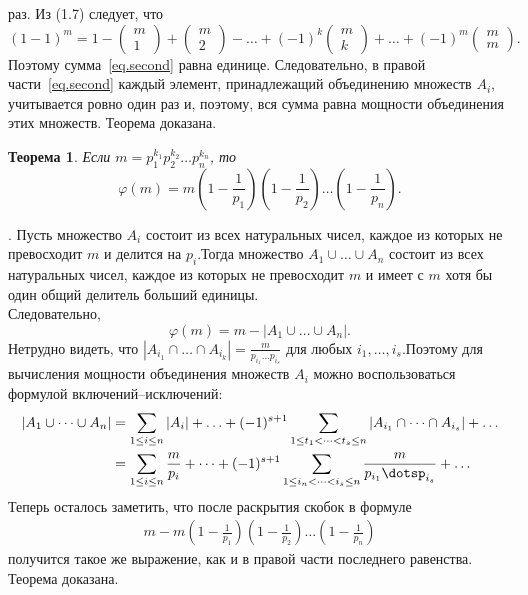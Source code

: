 \documentclass[14pt]{article}
\numberwithin{equation}{section}
\begin{document}
раз. Из (1.7) следует, что
\begin{equation*}
    (1-1)^m = 1- \begin{pmatrix} m \\ 1  \end{pmatrix} +\begin{pmatrix} m \\ 2  \end{pmatrix}-\dots+(-1)^k\begin{pmatrix} m \\ k  \end{pmatrix}+\dots+(-1)^m\begin{pmatrix} m \\ m  \end{pmatrix}.
\end{equation*}
Поэтому сумма~\eqref{eq.second} равна единице. Следовательно, в правой части~\eqref{eq.second} каждый элемент, принадлежащий объединению множеств $A_i$, учитывается
ровно один раз и, поэтому, вся сумма равна мощности объединения этих
множеств. Теорема доказана.
\newtheorem{Th}{ Теорема}
\begin{Th} Если $m=p_1^{k_1}p_2^{k_2} \ldots p_n^{k_n}$, то
\begin{equation*}
    \varphi(m)=m\left(1-\frac1{p_1}\right)\left(1-\frac1{p_2}\right)\ldots\left(1-\frac1{p_n}\right).
\end{equation*}
\end{Th}
{}. Пусть множество $A_i$ состоит из всех натуральных чисел, каждое из которых не превосходит $m$ и делится на $p_i$.Тогда множество $A_1\cup\dots\cup A_n$ состоит из всех натуральных чисел, каждое из которых не превосходит $m$ и имеет с $m$ хотя бы один общий делитель больший единицы.\\Следовательно,
\begin{equation*}
     \varphi(m)=m-|A_1 \cup\ldots\cup A_n|.
\end{equation*}
Нетрудно видеть, что $|A_{i_1}\cap\dots\cap A_{i_k}|=\frac m{p_{i_1}\dots p_{i_s}}$ для любых $i_1,\ldots,i_s$.Поэтому для вычисления мощности объединения множеств $A_i$ можно воспользоваться формулой включений–исключений:
\begin{align*}
    |A_1\cup\dots\cup A_n|  &=\sum_{1\le i \le n}|A_i|+\ldots+(-1)^{s+1}\sum_{1 \le t_1 <\dots< t_s \le n}|A_{i_1}\cap\dots\cap A_{i_s}|+\ldots\\
        &=\sum_{1\le i \le n}\frac m{p_i}+\dots+(-1)^{s+1}\sum_{1 \le i_n<\dots< i_s \le n}\frac m{p_{i_1}\dotsp_{i_s}}+\ldots
\end{align*}
Теперь осталось заметить, что после раскрытия скобок в формуле
\begin{align*}
    m-m\left(1-\frac1{p_1}\right)\left(1-\frac1{p_2}\right)\ldots\left(1-\frac1{p_n}\right)
\end{align*}
получится такое же выражение, как и в правой части последнего равенства.
Теорема доказана.
\end{document}

